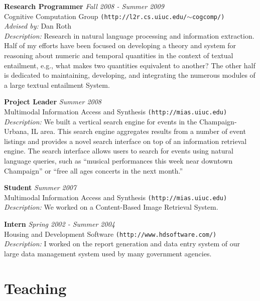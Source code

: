 \documentclass{report}
\begin{document}
{\bf Research Programmer} \hfill {\it Fall 2008 - Summer 2009} \\
Cognitive Computation Group \texttt{(http://l2r.cs.uiuc.edu/$\sim$cogcomp/)} \\
{\sl Advised by:} Dan Roth \\
{\sl Description:} Research in natural language processing and information extraction. Half of my efforts have been focused on developing a theory and system for reasoning about numeric and temporal quantities in the context of textual entailment, e.g., what makes two quantities equivalent to another? The other half is dedicated to maintaining, developing, and integrating the numerous modules of a large textual entailment System.

{\bf Project Leader} \hfill {\it Summer 2008} \\
Multimodal Information Access and Synthesis \texttt{(http://mias.uiuc.edu)} \\
{\sl Description:} We built a vertical search engine for events in the Champaign-Urbana, IL area. This search engine aggregates results from a number of event listings and provides a novel search interface on top of an information retrieval engine. The search interface allows users to search for events using natural language queries, such as ``musical performances this week near downtown Champaign'' or ``free all ages concerts in the next month.''

{\bf Student} \hfill {\it Summer 2007} \\
Multimodal Information Access and Synthesis \texttt{(http://mias.uiuc.edu)} \\
{\sl Description:} We worked on a Content-Based Image Retrieval System.				
				
{\bf Intern} \hfill {\it Spring 2002 - Summer 2004} \\
Housing and Development Software \texttt{(http://www.hdsoftware.com/)} \\
{\sl Description:} I worked on the report generation and data entry system of our large data management system used by many government agencies.


\section*{Teaching} 
\end{document}
